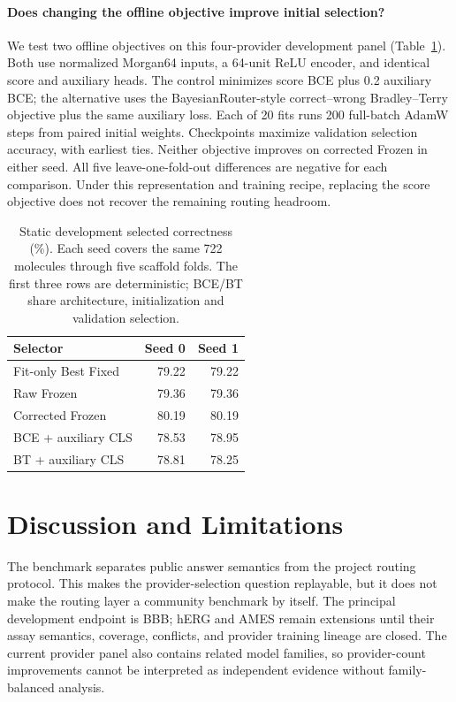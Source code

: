 \documentclass[sigconf,anonymous]{aamas}
\begin{document}
\paragraph{Does changing the offline objective improve initial selection?}
We test two offline objectives on this four-provider development panel (Table~\ref{tab:learned-prior}). Both use normalized Morgan64 inputs, a 64-unit ReLU encoder, and identical score and auxiliary heads. The control minimizes score BCE plus 0.2 auxiliary BCE; the alternative uses the BayesianRouter-style correct--wrong Bradley--Terry objective plus the same auxiliary loss. Each of 20 fits runs 200 full-batch AdamW steps from paired initial weights. Checkpoints maximize validation selection accuracy, with earliest ties. Neither objective improves on corrected Frozen in either seed. All five leave-one-fold-out differences are negative for each comparison. Under this representation and training recipe, replacing the score objective does not recover the remaining routing headroom.

\begin{table}[t]
\caption{Static development selected correctness (\%). Each seed covers the same 722 molecules through five scaffold folds. The first three rows are deterministic; BCE/BT share architecture, initialization and validation selection.}
\label{tab:learned-prior}
\centering
\small
\begin{tabular}{@{}lrr@{}}
\toprule
Selector & Seed 0 & Seed 1 \\
\midrule
Fit-only Best Fixed & 79.22 & 79.22 \\
Raw Frozen & 79.36 & 79.36 \\
Corrected Frozen & 80.19 & 80.19 \\
BCE + auxiliary CLS & 78.53 & 78.95 \\
BT + auxiliary CLS & 78.81 & 78.25 \\
\bottomrule
\end{tabular}
\end{table}

\section{Discussion and Limitations}
The benchmark separates public answer semantics from the project routing protocol. This makes the provider-selection question replayable, but it does not make the routing layer a community benchmark by itself. The principal development endpoint is BBB; hERG and AMES remain extensions until their assay semantics, coverage, conflicts, and provider training lineage are closed. The current provider panel also contains related model families, so provider-count improvements cannot be interpreted as independent evidence without family-balanced analysis.
\end{document}
